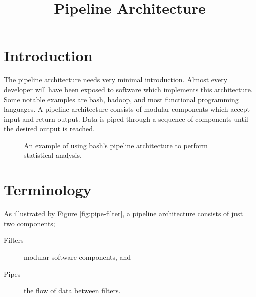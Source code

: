 \title{Pipeline Architecture}
\maketitle

\section{Introduction}

The pipeline architecture needs very minimal introduction.
Almost every developer will have been exposed to software which implements this architecture.
Some notable examples are bash, hadoop, and most functional programming languages.
A pipeline architecture consists of modular components which accept input and return output.
Data is piped through a sequence of components until the desired output is reached.

\begin{figure}[ht]
    \centering
{}
\caption{An example of using bash's pipeline architecture to perform statistical analysis.}
\label{fig:bash-example}
\end{figure}

\section{Terminology}

As illustrated by Figure \ref{fig:pipe-filter}, a pipeline architecture consists of just two components;

\begin{description}
    \item[Filters] modular software components, and
    \item[Pipes] the flow of data between filters.   
\end{description}

